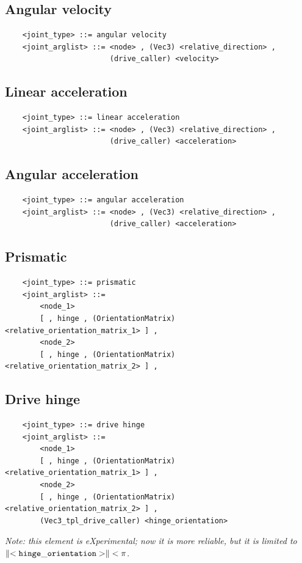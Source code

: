 \subsection{Angular velocity}
\begin{verbatim}
    <joint_type> ::= angular velocity
    <joint_arglist> ::= <node> , (Vec3) <relative_direction> , 
                        (drive_caller) <velocity>
\end{verbatim}

\subsection{Linear acceleration}
\begin{verbatim}
    <joint_type> ::= linear acceleration
    <joint_arglist> ::= <node> , (Vec3) <relative_direction> , 
                        (drive_caller) <acceleration>
\end{verbatim}

\subsection{Angular acceleration}
\begin{verbatim}
    <joint_type> ::= angular acceleration
    <joint_arglist> ::= <node> , (Vec3) <relative_direction> , 
                        (drive_caller) <acceleration>
\end{verbatim}

\subsection{Prismatic}
\begin{verbatim}
    <joint_type> ::= prismatic
    <joint_arglist> ::= 
        <node_1>
        [ , hinge , (OrientationMatrix) <relative_orientation_matrix_1> ] ,
        <node_2> 
        [ , hinge , (OrientationMatrix) <relative_orientation_matrix_2> ] ,    
\end{verbatim}

\subsection{Drive hinge}
\begin{verbatim}
    <joint_type> ::= drive hinge
    <joint_arglist> ::= 
        <node_1>
        [ , hinge , (OrientationMatrix) <relative_orientation_matrix_1> ] ,
        <node_2> 
        [ , hinge , (OrientationMatrix) <relative_orientation_matrix_2> ] ,
        (Vec3_tpl_drive_caller) <hinge_orientation>
\end{verbatim}
\emph{Note: this element is eXperimental; now it is more reliable, 
but it is limited to $\left\| \tt <hinge\_orientation> \right\| < \pi$}.

